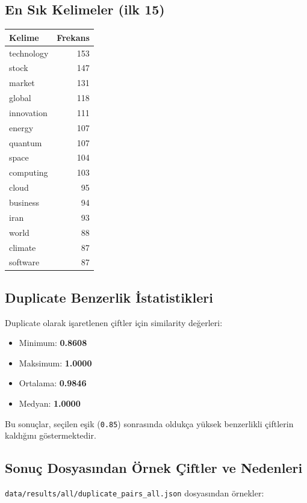 \documentclass[12pt,a4paper]{article}
\begin{document}
\subsection{En S\i{}k Kelimeler (ilk 15)}
\begin{center}
\begin{tabular}{lr}
\toprule
Kelime & Frekans \\
\midrule
technology & 153 \\
stock & 147 \\
market & 131 \\
global & 118 \\
innovation & 111 \\
energy & 107 \\
quantum & 107 \\
space & 104 \\
computing & 103 \\
cloud & 95 \\
business & 94 \\
iran & 93 \\
world & 88 \\
climate & 87 \\
software & 87 \\
\bottomrule
\end{tabular}
\end{center}

\subsection{Duplicate Benzerlik \.{I}statistikleri}
Duplicate olarak i\c{s}aretlenen \c{c}iftler i\c{c}in similarity de\u{g}erleri:
\begin{itemize}
    \item Minimum: \textbf{0.8608}
    \item Maksimum: \textbf{1.0000}
    \item Ortalama: \textbf{0.9846}
    \item Medyan: \textbf{1.0000}
\end{itemize}
Bu sonu\c{c}lar, se\c{c}ilen e\c{s}ik (\texttt{0.85}) sonras\i{}nda olduk\c{c}a y\"uksek benzerlikli \c{c}iftlerin kald\i{}\u{g}\i{}n\i{} g\"ostermektedir.

\subsection{Sonu\c{c} Dosyas\i{}ndan \"Ornek \c{C}iftler ve Nedenleri}
\texttt{data/results/all/duplicate\_pairs\_all.json} dosyas\i{}ndan \"ornekler:
\end{document}
